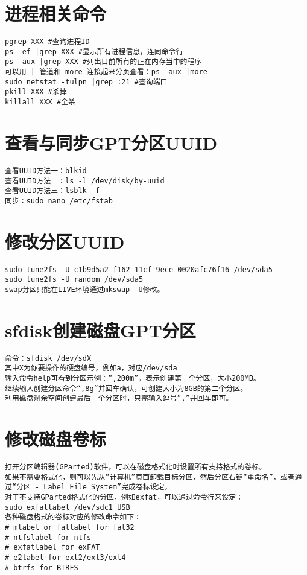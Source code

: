 \documentclass[a4paper,fontset=fandol,zihao=-4,linespread=1.2]{ctexbook}
\begin{document}
\section{进程相关命令}
\begin{lstlisting}
pgrep XXX #查询进程ID
ps -ef |grep XXX #显示所有进程信息，连同命令行
ps -aux |grep XXX #列出目前所有的正在内存当中的程序
可以用 | 管道和 more 连接起来分页查看：ps -aux |more
sudo netstat -tulpn |grep :21 #查询端口
pkill XXX #杀掉
killall XXX #全杀
\end{lstlisting}

\section{查看与同步GPT分区UUID}
\begin{lstlisting}
查看UUID方法一：blkid
查看UUID方法二：ls -l /dev/disk/by-uuid
查看UUID方法三：lsblk -f
同步：sudo nano /etc/fstab
\end{lstlisting}

\section{修改分区UUID}
\begin{lstlisting}
sudo tune2fs -U c1b9d5a2-f162-11cf-9ece-0020afc76f16 /dev/sda5
sudo tune2fs -U random /dev/sda5
swap分区只能在LIVE环境通过mkswap -U修改。
\end{lstlisting}

\section{sfdisk创建磁盘GPT分区}
\begin{lstlisting}
命令：sfdisk /dev/sdX
其中X为你要操作的硬盘编号，例如a，对应/dev/sda
输入命令help可看到分区示例：“,200m”，表示创建第一个分区，大小200MB。
继续输入创建分区命令“,8g”并回车确认，可创建大小为8GB的第二个分区。
利用磁盘剩余空间创建最后一个分区时，只需输入逗号“,”并回车即可。
\end{lstlisting}

\section{修改磁盘卷标}
\begin{lstlisting}
打开分区编辑器(GParted)软件，可以在磁盘格式化时设置所有支持格式的卷标。
如果不需要格式化，则可以先从“计算机”页面卸载目标分区，然后分区右键“重命名”，或者通过“分区 - Label File System”完成卷标设定。
对于不支持GParted格式化的分区，例如exfat，可以通过命令行来设定：
sudo exfatlabel /dev/sdc1 USB
各种磁盘格式的卷标对应的修改命令如下：
# mlabel or fatlabel for fat32
# ntfslabel for ntfs
# exfatlabel for exFAT
# e2label for ext2/ext3/ext4
# btrfs for BTRFS
\end{lstlisting}
\end{document}

